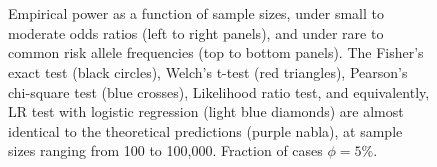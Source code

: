 \begin{figure}[!tpb]
{        }\\ %
        \\ %
\caption{Empirical power as a function of sample sizes, under small to moderate odds ratios (left to right panels), and under rare to common risk allele frequencies (top to bottom panels).
The Fisher's exact test (black circles), Welch's t-test (red triangles), Pearson's chi-square test (blue crosses), Likelihood ratio test, and equivalently, LR test with logistic regression (light blue diamonds) are almost identical to the theoretical predictions (purple nabla), at sample sizes ranging from 100 to 100,000. Fraction of cases $\phi = 5\%$.
}\label{fig:compare-phi005}
\end{figure}
\fi



